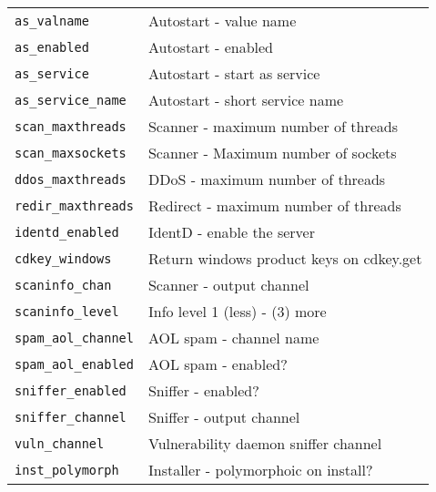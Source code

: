 \begin{table}[ht!]
\begin{tabular}{ll}
		\verb|as_valname| & Autostart - value name\\
		\verb|as_enabled| & Autostart - enabled\\
		\verb|as_service| & Autostart - start as service\\
		\verb|as_service_name| & Autostart - short service name\\
		\verb|scan_maxthreads| & Scanner - maximum number of threads\\
		\verb|scan_maxsockets| & Scanner - Maximum number of sockets\\
		\verb|ddos_maxthreads| & DDoS - maximum number of threads\\
		\verb|redir_maxthreads| & Redirect - maximum number of threads\\
		\verb|identd_enabled| & IdentD - enable the server\\
		\verb|cdkey_windows| & Return windows product keys on cdkey.get\\
		\verb|scaninfo_chan| & Scanner - output channel\\
		\verb|scaninfo_level| & Info level 1 (less) - (3) more\\
		\verb|spam_aol_channel| & AOL spam - channel name\\
		\verb|spam_aol_enabled| & AOL spam - enabled?\\
		\verb|sniffer_enabled| & Sniffer - enabled?\\
		\verb|sniffer_channel| & Sniffer - output channel\\
		\verb|vuln_channel| & Vulnerability daemon sniffer channel\\
		\verb|inst_polymorph| & Installer - polymorphoic on install?\\\bottomrule
	\end{tabular}
\end{table}

